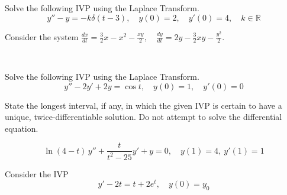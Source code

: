 \documentclass[12pt]{exam}
\begin{document}
\begin{questions}
\begin{enumerate}[label=\roman*)]
    \end{enumerate}    
  
    
    \newpage \Initials
    \question[7] Solve the following IVP using the Laplace Transform. 
        $$y''-y=-k\delta(t-3), \quad y(0)=2,\quad y'(0)=4, \quad k \in \mathbb R$$  %
      
    
    
    
\newpage \Initials
    \question[14] 
    Consider the system $\displaystyle \frac{dx}{dt} = \frac32 x - x^2 - \frac{xy}{2} , \quad \frac{dy}{dt} = 2y - \frac 32 xy - \frac{y^2}{2}$. %
    
\newpage \Initials \\ \LastPage     
    

\newpage \Initials

    \question[5] Solve the following IVP using the Laplace Transform. 
        $$y'' - 2y'  + 2y =\cos t, \quad y(0)=1,\quad y'(0)=0$$  %
  
    
    
    
\newpage \Initials
    \question[2] State the longest interval, if any, in which the given IVP is certain to have a unique, twice-differentiable solution. Do not attempt to solve the differential equation. 
    
    $$\ln (4 - t) \, y''+\frac{t}{t^2-25}y'+y=0, \quad y(1)=4,\ y'(1)=1$$ %
    
    \vspace{2cm} 


    \question[8] 
    Consider the IVP 
    $$y' - 2 t = t + 2e^t, \quad y(0) = y_0$$ %
\end{questions}
\end{document}
